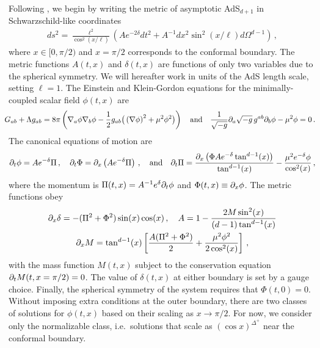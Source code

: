 \documentclass[../PhD.tex]{subfiles}
\begin{document}
Following \cite{1508.02709}, we begin by writing the metric of asymptotic AdS$_{d+1}$ in Schwarzschild-like coordinates 
\begin{align}
ds^2 = \frac{\ell^2}{\cos^2 \left(x / \ell \right)} \left( A e^{-2\delta} dt^2 + A^{-1}dx^2 \sin^2 \left(x / \ell \right) d\Omega^{d-1} \right) \, ,
\end{align}
where $x \in [0, \pi/2)$ and $x = \pi / 2$ corresponds to the conformal boundary. The metric functions $A(t,x)$ and $\delta(t,x)$ are functions of only two variables due to the spherical symmetry. We will hereafter work in units of the AdS length scale, setting $\ell = 1$. The Einstein and Klein-Gordon equations for the minimally-coupled scalar field $\phi(t,x)$ are
\begin{align}
\!\!\!\! G_{ab} + \Lambda g_{ab} = 8\pi \left( \nabla_a \phi \nabla_b \phi - \frac{1}{2} g_{ab} \big( \left( \nabla \phi \right)^2 + \mu^2 \phi^2 \big) \right) \quad \text{and} \quad \frac{1}{\sqrt{-g}} \partial_a \sqrt{-g} \, g^{ab} \partial_b \phi - \mu^2 \phi = 0 \, .
\end{align}
The canonical equations of motion are \cite{1210.1566}
\begin{align}
\label{canon eqns}
\partial_t \phi = A e^{-\delta} \Pi \, , \quad \partial_t \Phi = \partial_x \left( A e^{-\delta} \Pi \right) \, , \quad \text{and} \quad \partial_t \Pi = \frac{\partial_x \left( \Phi A e^{-\delta} \tan^{d-1} (x) \right)}{\tan^{d-1}(x)} - \frac{\mu^2 e^{-\delta} \phi}{\cos^2 (x)} \, ,
\end{align}
where the momentum is $\Pi(t,x) = A^{-1} e^{\delta} \partial_t \phi$ and $\Phi(t,x) \equiv \partial_x \phi$. The metric functions obey
\begin{align}
\label{metric funcs}
\begin{gathered}
\partial_x \delta = - (\Pi^2 + \Phi^2 ) \sin (x) \cos(x) \, , \quad A = 1 - \frac{2M \sin^2 (x) }{(d-1) \tan^{d-1}(x)} \\
\partial_x M = \tan^{d-1}(x) \left[ \frac{A (\Pi^2 + \Phi^2)}{2} + \frac{\mu^2 \phi^2}{2 \cos^2 (x)} \right] \, ,
\end{gathered}
\end{align}
with the mass function $M(t,x)$ subject to the conservation equation $\partial_t M( t, x = \pi/2) = 0$. The value of $\delta(t,x)$ at either boundary is set by a gauge choice. Finally, the spherical symmetry of the system requires that $\Phi (t, 0) = 0$. Without imposing extra conditions at the outer boundary, there are two classes of solutions for $\phi(t,x)$ based on their scaling as $x \to \pi/2$. For now, we consider only the normalizable class, i.e.~solutions that scale as $(\cos x)^{\Delta^+}$ near the conformal boundary.
\end{document}

